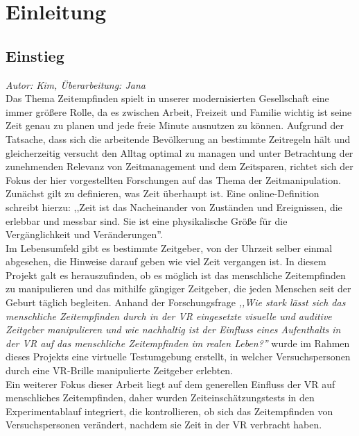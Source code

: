 \documentclass{Bericht}
\begin{document}
\maketitle


\tableofcontents
\clearpage

\section{Einleitung}
\subsection{Einstieg}
\textit{Autor: Kim, Überarbeitung: Jana}\\
	Das Thema Zeitempfinden spielt in unserer modernisierten Gesellschaft eine immer größere Rolle, da es zwischen Arbeit, Freizeit und Familie wichtig ist seine Zeit genau zu planen und jede freie Minute ausnutzen zu können.	
	Aufgrund der Tatsache, dass sich die arbeitende Bevölkerung an bestimmte Zeitregeln hält und gleicherzeitig versucht den Alltag optimal zu managen und unter Betrachtung der zunehmenden Relevanz von Zeitmanagement und dem Zeitsparen, richtet sich der Fokus der hier vorgestellten Forschungen auf das Thema der Zeitmanipulation. Zunächst gilt zu definieren, was Zeit überhaupt ist. Eine online-Definition schreibt hierzu: ,,Zeit ist das Nacheinander von Zuständen und Ereignissen, die erlebbar und messbar sind. Sie ist eine physikalische Größe für die Vergänglichkeit und Veränderungen''.\cite{def}\\
	Im Lebensumfeld gibt es bestimmte Zeitgeber, von der Uhrzeit selber einmal abgesehen, die Hinweise darauf geben wie viel Zeit vergangen ist. In diesem Projekt galt es herauszufinden, ob es möglich ist das menschliche Zeitempfinden zu manipulieren und das mithilfe gängiger Zeitgeber, die jeden Menschen seit der Geburt täglich begleiten. Anhand der Forschungsfrage \textit{,,Wie stark lässt sich das menschliche
Zeitempfinden durch in der VR eingesetzte visuelle und auditive Zeitgeber manipulieren und
wie nachhaltig ist der Einfluss eines Aufenthalts in der VR auf das menschliche Zeitempfinden
im realen Leben?''} wurde im Rahmen dieses Projekts eine virtuelle Testumgebung erstellt, in welcher Versuchspersonen durch eine VR-Brille manipulierte Zeitgeber erlebten.\\
Ein weiterer Fokus dieser Arbeit liegt auf dem generellen Einfluss der VR auf menschliches Zeitempfinden, daher wurden Zeiteinschätzungstests in den Experimentablauf integriert, die kontrollieren, ob sich das Zeitempfinden von Versuchspersonen verändert, nachdem sie Zeit in der VR verbracht haben.\\
\end{document}
